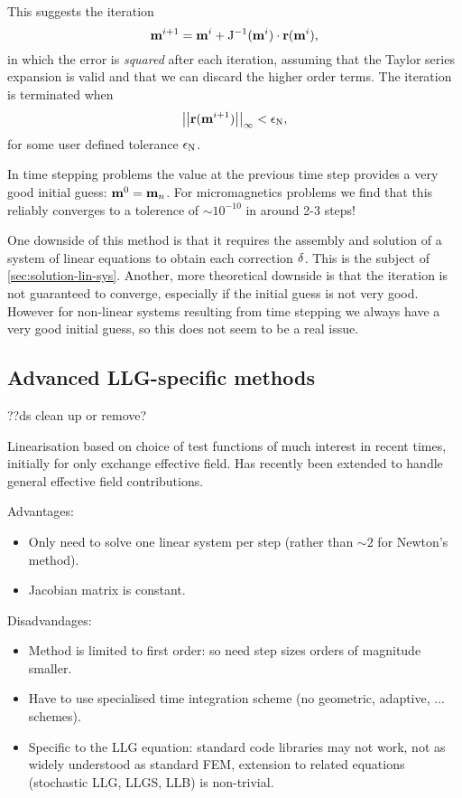 This suggests the iteration
\begin{equation}
  \mathbf{m}^{i+1} = \mathbf{m}^i + \mathrm{J}^{-1}(\mathbf{m}^i) \cdot \mathbf{r}(\mathbf{m}^i),
\end{equation}
in which the error is \emph{squared} after each iteration, assuming that the Taylor series expansion is valid and that we can discard the higher order terms.
The iteration is terminated when
\begin{equation}
  \left| \left| \mathbf{r}(\mathbf{m}^{i+1}) \right| \right|_{\infty} < \epsilon_{\text{N}},
\end{equation}
for some user defined tolerance $\epsilon_{\text{N}}$.

In time stepping problems the value at the previous time step provides a very good initial guess: $\mathbf{m}^0 = \mathbf{m}_n$.
For micromagnetics problems we find that this reliably converges to a tolerence of $\sim 10^{-10}$ in around 2-3 steps!

One downside of this method is that it requires the assembly and solution of a system of linear equations to obtain each correction $\mathbf{\delta}$.
This is the subject of \cref{sec:solution-lin-sys}.
Another, more theoretical downside is that the iteration is not guaranteed to converge, especially if the initial guess is not very good.
However for non-linear systems resulting from time stepping we always have a very good initial guess, so this does not seem to be a real issue.


\subsection{Advanced LLG-specific methods}
\label{sec:advanced-lin}

??ds clean up or remove?

Linearisation based on choice of test functions of much interest in recent times, initially for only exchange effective field\cite{Alouges2008}.
Has recently been extended to handle general effective field contributions\cite{Banas2012}.

Advantages:
\begin{itemize}
\item Only need to solve one linear system per step (rather than $\sim 2$ for Newton's method).
\item Jacobian matrix is constant.
\end{itemize}

Disadvandages:
\begin{itemize}
\item Method is limited to first order: so need step sizes orders of magnitude smaller.
\item Have to use specialised time integration scheme (no geometric, adaptive, ... schemes).
\item Specific to the LLG equation: standard code libraries may not work, not as widely understood as standard FEM, extension to related equations (stochastic LLG, LLGS, LLB) is non-trivial.
\end{itemize}

